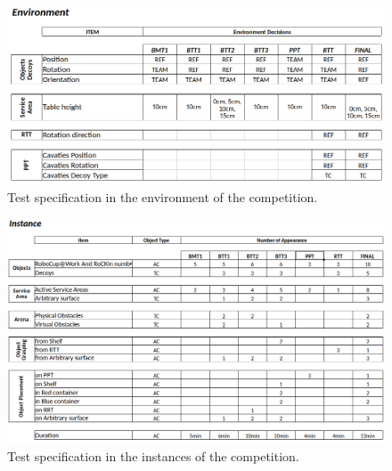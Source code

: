 \begin{figure}[h!]
	\centering
	\includegraphics[width= 1.0\textwidth ]{./images/tabels/env_table.png}
	\caption{Test specification in the environment of the \RCAW \YEAR competition.}
	\label{fig:test_specifications_environment}
\end{figure}

\begin{figure}[h!]
	\centering
	\includegraphics[width= 1.0\textwidth ]{./images/tabels/Instance_Table.png}
	\caption{Test specification in the instances of the \RCAW \YEAR competition.}
	\label{fig:test_specifications_instance}
\end{figure}



